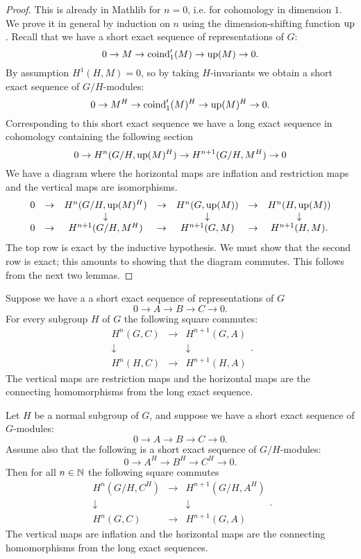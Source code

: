 \begin{proof}
	This is already in Mathlib for $n=0$, i.e. for cohomology in
	dimension $1$.
	We prove it in general by induction on $n$ using the dimension-shifting function $\mathrm{up}$.
	Recall that we have a short exact sequence of representations of $G$:
	\[
		0 \to M \to \mathrm{coind}_1'(M) \to \mathrm{up}(M) \to 0.
	\]
	By assumption $H^1(H,M)=0$, so by taking $H$-invariants we obtain a short exact sequence of $G/H$-modules:
	\[
		0 \to M^H \to \mathrm{coind}_1'(M)^H \to \mathrm{up}(M)^H \to 0.
	\]
	Corresponding to this short exact sequence we have a long exact sequence in cohomology
	containing the following section
	\[
		 0 \to H^n(G/H, \mathrm{up}(M)^H) \to  H^{n+1}(G/H, M^H) \to 0
	\]
	We have a diagram where the horizontal maps are inflation and restriction maps and the vertical
	maps are isomorphisms.
	\[
		\begin{matrix}
			0 &\to& H^{n}(G/H, \mathrm{up}(M)^H) &\to &H^{n}(G,\mathrm{up}(M)) & \to & H^n(H,\mathrm{up}(M)) \\
			  &   &   \downarrow              &    &  \downarrow         &     &  \downarrow  \\
			0 &\to& H^{n+1}(G/H, M^H) &\to &H^{n+1}(G,M) & \to & H^{n+1}(H,M).
		\end{matrix}
	\]
	The top row is exact by the inductive hypothesis.
	We must show that the second row is exact; this amounts to showing that the diagram commutes.
	This follows from the next two lemmas.
\end{proof}

\begin{lemma}
	Suppose we have a a short exact sequence of representations of $G$
	\[
			0 \to  A \to  B \to  C  \to  0.
	\]
	For every subgroup $H$ of $G$ the following square commutes:
	\[
		\begin{matrix}
			H^{n}(G,C) & \to & H^{n+1}(G,A)\\
			\downarrow & & \downarrow \\
			H^n(H,C) & \to &H^{n+1}(H,A)
		\end{matrix}.
	\]
	The vertical maps are restriction maps and the horizontal maps are the connecting homomorphisms
	from the long exact sequence.
\end{lemma}

\begin{lemma}
	Let $H$ be a normal subgroup of $G$, and suppose we have a short exact
	sequence of $G$-modules:
	\[
			0 \to  A \to  B \to  C  \to  0.
	\]
	Assume also that the following is a short exact sequence of $G/H$-modules:
	\[
			0 \to  A^H \to  B^H \to  C^H  \to  0.
	\]
	Then for all $n \in {\mathbb N}$ the following square commutes
	\[
		\begin{matrix}
			H^{n}(G/H,C^H) & \to & H^{n+1}(G/H,A^H)\\
			\downarrow & & \downarrow \\
			H^n(G,C) & \to & H^{n+1}(G,A)
		\end{matrix}.
	\]
	The vertical maps are inflation and the horizontal maps are the connecting homomorphisms
	from the long exact sequences.
\end{lemma}


